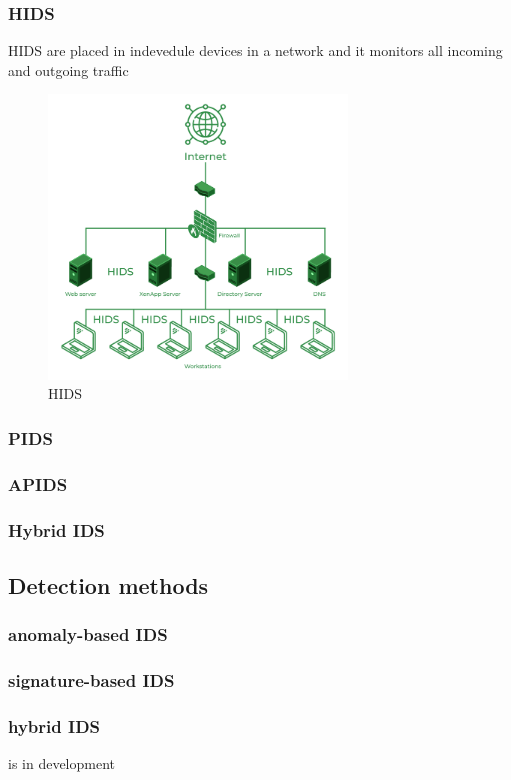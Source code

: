 \subsubsection{HIDS}
HIDS are placed in indevedule devices in a network and it monitors all incoming and outgoing traffic

\begin{figure}[h]
	\centering
	\includegraphics[width=300px]{figures/HIDS.png}
	\caption{HIDS \cite{HIDS-and-NIDS-geeksforgeeks}}
	\label{fig:HIDS}
\end{figure}



\subsubsection{PIDS}
\subsubsection{APIDS}
\subsubsection{Hybrid IDS}




\subsection{Detection methods}
\subsubsection{anomaly-based IDS}
\subsubsection{signature-based IDS}
\subsubsection{hybrid IDS}
is in development



